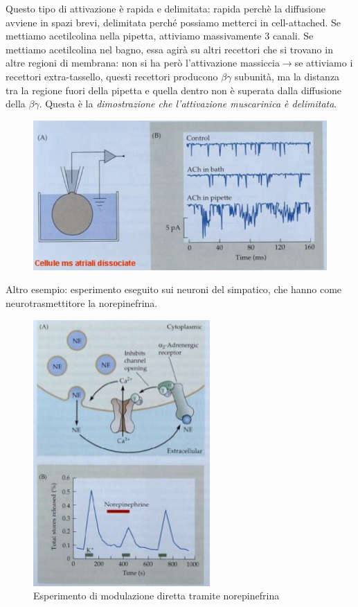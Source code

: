 \documentclass[a4paper,12pt]{article}
\newcommand{\lfreccia}{\ensuremath{\longrightarrow}}
\begin{document}
Questo tipo di attivazione è rapida e delimitata: rapida perchè la diffusione avviene in spazi brevi, delimitata perché possiamo metterci in cell-attached. Se mettiamo acetilcolina nella pipetta, attiviamo massivamente 3 canali.
Se mettiamo acetilcolina nel bagno, essa agirà su altri recettori che si trovano in altre regioni di membrana: non si ha però l'attivazione massiccia\lfreccia se attiviamo i recettori extra-tassello, questi recettori producono $\beta \gamma$ subunità, ma la distanza tra la regione fuori della pipetta e quella dentro non è superata dalla diffusione della $\beta \gamma$. Questa è la \emph{dimostrazione che l'attivazione muscarinica è delimitata}.
\begin{figure}[H]
\centering
\includegraphics[scale=0.4]{immagine/acetilcolina.jpg}
\caption{}
\label{img:frat}
\end{figure} 

Altro esempio: esperimento eseguito sui neuroni del simpatico, che hanno come neurotrasmettitore la norepinefrina.
\begin{figure}[H]
\centering
\includegraphics[scale=0.4]{immagine/norepinefrina.jpg}
\caption{Esperimento di modulazione diretta tramite norepinefrina }
\label{img:nor}
\end{figure} 
\end{document}
